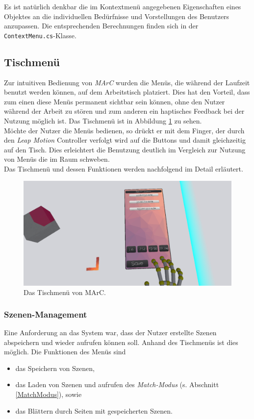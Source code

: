 Es ist natürlich denkbar die im Kontextmenü angegebenen Eigenschaften eines Objektes an die individuellen Bedürfnisse und Vorstellungen des Benutzers anzupassen. Die entsprechenden Berechnungen finden sich in der \texttt{ContextMenu.cs}-Klasse.

\subsection{Tischmenü}\label{sec:TableMenü}
Zur intuitiven Bedienung von \textit{MArC} wurden die Menüs, die während der Laufzeit benutzt werden können, auf dem Arbeitstisch platziert. Dies hat den Vorteil, dass zum einen diese Menüs permanent sichtbar sein können, ohne den Nutzer während der Arbeit zu stören und zum anderen ein haptisches Feedback bei der Nutzung möglich ist. Das Tischmenü ist in Abbildung \ref{fig:Tischmenue} zu sehen.\\
Möchte der Nutzer die Menüs bedienen, so drückt er mit dem Finger, der durch den \textit{Leap Motion} Controller verfolgt wird auf die Buttons und damit gleichzeitig auf den Tisch. Dies erleichtert die Benutzung deutlich im Vergleich zur Nutzung von Menüs die im Raum schweben.\\
Das Tischmenü und dessen Funktionen werden nachfolgend im Detail erläutert.


\begin{figure}
	\centering
	\includegraphics[width=\textwidth]{Bilder/Tablemenu}
	\caption{Das Tischmenü von MArC.}
	\label{fig:Tischmenue}
\end{figure}
\subsubsection{Szenen-Management}
Eine Anforderung an das System war, dass der Nutzer erstellte Szenen abspeichern und wieder aufrufen können soll. Anhand des Tischmenüs ist dies möglich. Die Funktionen des Menüs sind
\begin{itemize}
	\item das Speichern von Szenen,
	\item das Laden von Szenen und aufrufen des \textit{Match-Modus} (s. Abschnitt \ref{MatchModus}), sowie
	\item das Blättern durch Seiten mit gespeicherten Szenen.
\end{itemize}

